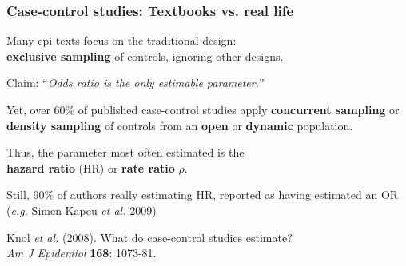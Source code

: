 \documentclass[12pt,dvipsnames,t,handout%
,aspectratio=169%
]{beamer}
\begin{document}
\begin{frame}
\frametitle{\large Case-control studies: Textbooks vs. real life}

\pause
\bi
\item
Many epi texts %
focus on the traditional design: \\
 \textbf{exclusive sampling} of controls, ignoring other designs.
\pause
\medskip
\item
Claim: ``\textit{Odds ratio is the only estimable parameter.}'' 
 \pause
\medskip
\item
 Yet, over 60\% of published case-control 
 studies apply \textbf{concurrent sampling}
 or {\bf density sampling} of controls from an \textbf{open} or
 \textbf{dynamic} population. 
 \pause
 \medskip
 \item
 Thus, the parameter most often estimated %
 is the \\ {\bf hazard ratio} (HR) or {\bf rate ratio} $\rho$.
\pause
 \medskip
 \item
  Still,  90\% of authors really estimating HR, 
  reported as having estimated an OR ({\it e.g.} Simen Kapeu {\it et al.} 2009)
\ei
\pause

{\small Knol {\it et al.} (2008). What do case-control studies estimate? \\%
{\it Am J Epidemiol} {\bf 168}: 1073-81. }
\end{frame}
\end{document}
